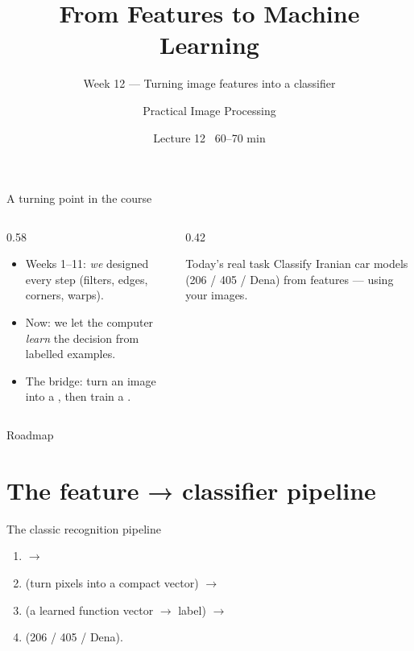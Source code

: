 \documentclass[10pt,aspectratio=169]{beamer}
\title{From Features to Machine Learning}
\subtitle{Week 12 — Turning image features into a classifier}
\author{Practical Image Processing}
\date{Lecture 12 \textbullet\ 60--70 min}
\begin{document}
\maketitle

\begin{frame}{A turning point in the course}
  \begin{columns}[T]
    \begin{column}{0.58\textwidth}
      \begin{itemize}
        \item Weeks 1--11: \emph{we} designed every step (filters, edges, corners, warps).
        \item \alert{Now:} we let the computer \emph{learn} the decision from labelled examples.
        \item The bridge: turn an image into a , then train a .
      \end{itemize}
    \end{column}
    \begin{column}{0.42\textwidth}
      \begin{alertblock}{Today's real task}
        Classify Iranian car models (206 / 405 / Dena) from  features — using your
         images.
      \end{alertblock}
    \end{column}
  \end{columns}
\end{frame}

\begin{frame}{Roadmap}\tableofcontents\end{frame}

\section{The feature → classifier pipeline}

\begin{frame}{The classic recognition pipeline}
  \begin{enumerate}
    \item {} $\rightarrow$
    \item {} (turn pixels into a compact vector) $\rightarrow$
    \item {} (a learned function vector $\rightarrow$ label) $\rightarrow$
    \item {} (206 / 405 / Dena).
  \end{enumerate}
\end{frame}
\end{document}
